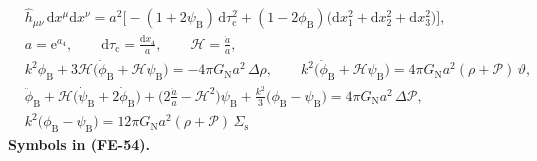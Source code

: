 \documentclass[
  10pt,
]{article}
\begin{document}
\[
\begin{aligned}
&\hat h_{\mu\nu}\,\mathrm{d}x^\mu\mathrm{d}x^\nu = a^2\Big[-(1 + 2\psi_{\mathrm{B}})\,\mathrm{d}\tau_{\mathrm{c}}^2
 + (1 - 2\phi_{\mathrm{B}})\big(\mathrm{d}x_1^2 + \mathrm{d}x_2^2 + \mathrm{d}x_3^2\big)\Big],\\
&a = \mathrm{e}^{a_4},\qquad \mathrm{d}\tau_{\mathrm{c}} = \frac{\mathrm{d}x_4}{a},\qquad \mathcal{H} = \frac{\dot a}{a},\\
&k^2\phi_{\mathrm{B}} + 3\mathcal{H}\big(\dot\phi_{\mathrm{B}} + \mathcal{H}\psi_{\mathrm{B}}\big) = -4\pi G_{\mathrm{N}}a^2\,\Delta\rho,\qquad
 k^2\big(\dot\phi_{\mathrm{B}} + \mathcal{H}\psi_{\mathrm{B}}\big) = 4\pi G_{\mathrm{N}}a^2(\rho + \mathcal{P})\,\vartheta,\\
&\ddot\phi_{\mathrm{B}} + \mathcal{H}\big(\dot\psi_{\mathrm{B}} + 2\dot\phi_{\mathrm{B}}\big) + \Big(2\frac{\ddot a}{a} - \mathcal{H}^2\Big)\psi_{\mathrm{B}}
 + \frac{k^2}{3}\big(\phi_{\mathrm{B}} - \psi_{\mathrm{B}}\big) = 4\pi G_{\mathrm{N}}a^2\,\Delta\mathcal{P},\\
&k^2\big(\phi_{\mathrm{B}} - \psi_{\mathrm{B}}\big) = 12\pi G_{\mathrm{N}}a^2(\rho + \mathcal{P})\,\Sigma_{\mathrm{s}}
\end{aligned} \tag{FE-54}
\] \textbf{Symbols in (FE-54).}
\end{document}
